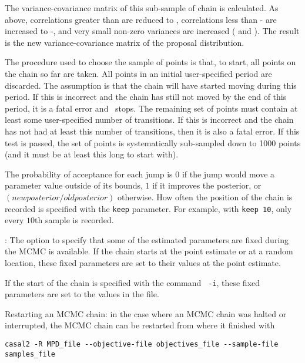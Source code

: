 The variance-covariance matrix of this sub-sample of chain is calculated. As above, correlations greater than  are reduced to , correlations less than - are increased to  -, and very small non-zero variances are increased ( and ). The result is the new variance-covariance matrix of the proposal distribution. 

The procedure used to choose the sample of points is that, to start, all points on the chain so far are taken.  All points in an initial user-specified period are discarded. The assumption is that the chain will have started moving during this period. If this is incorrect and the chain has still not moved by the end of this period, it is a fatal error and \CNAME\ stops. The remaining set of points must contain at least some user-specified number of transitions. If this is incorrect and the chain has not had at least this number of transitions, then it is also a fatal error. If this test is passed, the set of points is systematically sub-sampled down to 1000 points (and it must be at least this long to start with).

The probability of acceptance for each jump is $0$ if the jump would move a parameter value outside of its bounds, $1$ if it improves the posterior, or $(new posterior/old posterior)$ otherwise. How often the position of the chain is recorded is specified with the \texttt{keep} parameter. For example, with \texttt{keep 10}, only every $10$th sample is recorded.

: The option to specify that some of the estimated parameters are fixed during the MCMC is available. If the chain starts at the point estimate or at a random location, these fixed parameters are set to their values at the point estimate.

If  the start of the chain is specified with the command \texttt{\cname\ -i}, these fixed parameters are set to the values in the file.

Restarting an MCMC chain: in the case where an MCMC chain was halted or interrupted, the MCMC chain can be restarted from where it finished with

{\small{\begin{verbatim}
casal2 -R MPD_file --objective-file objectives_file --sample-file samples_file
\end{verbatim}}}

